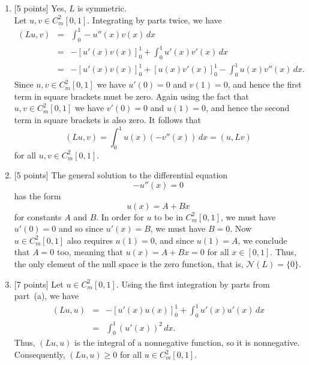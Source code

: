 \begin{solution}
\begin{enumerate}
\item {[5 points]} Yes, $L$ is symmetric.\\
      Let $u,v \in C_m^2[0,1]$. Integrating by parts twice, we have
       \begin{eqnarray*}
        (Lu, v) &=& \int_0^1 -u''(x) v(x)\, dx  \\[0.5em]
                &=& -[u'(x) v(x)]_0^1 + \int_0^1 u'(x) v'(x)\, dx \\[0.5em]
                &=& -[u'(x) v(x)]_0^1 + [u(x) v'(x)]_0^1 - \int_0^1 u(x) v''(x)\, dx.
       \end{eqnarray*}
       Since $u, v\in C_m^2[0,1]$ we have $u'(0)=0$ and $v(1) = 0$, and hence
       the first term in square brackets must be zero.  
       Again using the fact that $u, v\in C_m^2[0,1]$ we have $v'(0)=0$ and $u(1) = 0$,  
       and hence the second term in square brackets is also zero.  
       It follows that
\[
(L u, v) = \int_0^1 u(x) (-v''(x))\, dx = (u, L v)
\]
for all $u, v\in C_m^2[0,1]$.
\\
\item {[5 points]} The general solution to the differential equation 
          \[ -u''(x) = 0\]
        has the form
          \[ u(x) = A + B x\]
        for constants $A$ and $B$. In order for $u$ to be in $C_m^2[0,1]$, we must have $u'(0)=0$ and so
        since $u'(x) = B$, we must have $B=0$.  Now $u\in C_m^2[0,1]$ also requires
        $u(1) = 0$, and since $u(1)=A$, we conclude that $A=0$ too, meaning that
        $u(x) = A+Bx = 0$ for all $x\in[0,1]$.  
        Thus, the only element of the null space is the zero function,
        that is, $\mathcal{N}(L) = \{0\}$.
\\
\item {[7 points]} Let $u\in C_m^2[0,1]$.
        Using the first integration by parts from part~(a), we have
          \begin{eqnarray*}
               (L u, u) &=&  -[u'(x) u(x)]_0^1 + \int_0^1 u'(x) u'(x)\, dx \\[0.5em]
                          &=&  \int_0^1 (u'(x))^2\, dx.
          \end{eqnarray*}
         Thus, $(L u, u)$ is the integral of a nonnegative function, so it is nonnegative. Consequently, $(L u, u)\ge0$ for all $u\in C_m^2[0,1]$.


\end{enumerate}
\end{solution}
